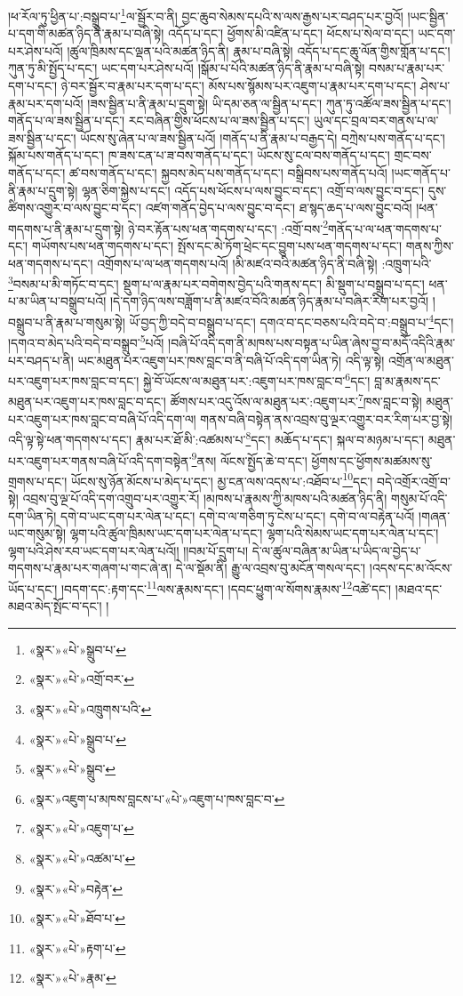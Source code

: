 །ཕ་རོལ་ཏུ་ཕྱིན་པ་:བསྒྲུབ་པ་\footnote{«སྣར་»«པེ་»སྒྲུབ་པ་}ལ་སྦྱོར་བ་ནི། བྱང་ཆུབ་སེམས་དཔའི་ས་ལས་རྒྱས་པར་བཤད་པར་བྱའོ། །ཡང་སྦྱིན་པ་དག་གི་མཚན་ཉིད་ནི་རྣམ་པ་བཞི་སྟེ། འདོད་པ་དང་། ཕྱོགས་མི་འཛིན་པ་དང་། ཕོངས་པ་སེལ་བ་དང་། ཡང་དག་པར་ཤེས་པའོ། །ཚུལ་ཁྲིམས་དང་ལྡན་པའི་མཚན་ཉིད་ནི། རྣམ་པ་བཞི་སྟེ། འདོད་པ་དང་ཆུ་ལོན་གྱིས་གློན་པ་དང་། ཀུན་ཏུ་མི་སྤྱོད་པ་དང་། ཡང་དག་པར་ཤེས་པའོ། །སྒོམ་པ་པོའི་མཚན་ཉིད་ནི་རྣམ་པ་བཞི་སྟེ། བསམ་པ་རྣམ་པར་དག་པ་དང་། ཉེ་བར་སྦྱོར་བ་རྣམ་པར་དག་པ་དང་། མོས་པས་སྙོམས་པར་འཇུག་པ་རྣམ་པར་དག་པ་དང་། ཤེས་པ་རྣམ་པར་དག་པའོ། །ཟས་སྦྱིན་པ་ནི་རྣམ་པ་དྲུག་སྟེ། ཡི་དམ་ཅན་ལ་སྦྱིན་པ་དང་། ཀུན་ཏུ་འཚོལ་ཟས་སྦྱིན་པ་དང་། གནོད་པ་ལ་ཟས་སྦྱིན་པ་དང་། རང་བཞིན་གྱིས་ཕོངས་པ་ལ་ཟས་སྦྱིན་པ་དང་། ཡུལ་དང་བྲལ་བར་གནས་པ་ལ་ཟས་སྦྱིན་པ་དང་། ཡོངས་སུ་ཞེན་པ་ལ་ཟས་སྦྱིན་པའོ། །གནོད་པ་ནི་རྣམ་པ་བརྒྱད་དེ། བཀྲེས་པས་གནོད་པ་དང་། སྐོམ་པས་གནོད་པ་དང་། ཁ་ཟས་ངན་པ་ཟ་བས་གནོད་པ་དང་། ཡོངས་སུ་ངལ་བས་གནོད་པ་དང་། གྲང་བས་གནོད་པ་དང་། ཚ་བས་གནོད་པ་དང་། སྐྱབས་མེད་པས་གནོད་པ་དང་། བསྒྲིབས་པས་གནོད་པའོ། །ཡང་གནོད་པ་ནི་རྣམ་པ་དྲུག་སྟེ། ལྷན་ཅིག་སྐྱེས་པ་དང་། འདོད་པས་ཕོངས་པ་ལས་བྱུང་བ་དང་། འགྲོ་བ་ལས་བྱུང་བ་དང་། དུས་ཚིགས་འགྱུར་བ་ལས་བྱུང་བ་དང་། འཛག་གནོད་བྱེད་པ་ལས་བྱུང་བ་དང་། ཐ་སྙད་ཆད་པ་ལས་བྱུང་བའོ། །ཕན་གདགས་པ་ནི་རྣམ་པ་དྲུག་སྟེ། ཉེ་བར་རྟོན་པས་ཕན་གདགས་པ་དང་། :འགྲོ་བས་\footnote{«སྣར་»«པེ་»འགྲོ་བར་}གནོད་པ་ལ་ཕན་གདགས་པ་དང་། གཡོགས་པས་ཕན་གདགས་པ་དང་། སྤོས་དང་མེ་ཏོག་ཕྲེང་དང་བྱུག་པས་ཕན་གདགས་པ་དང་། གནས་ཀྱིས་ཕན་གདགས་པ་དང་། འགྲོགས་པ་ལ་ཕན་གདགས་པའོ། །མི་མཛའ་བའི་མཚན་ཉིད་ནི་བཞི་སྟེ། :འཁྲུག་པའི་\footnote{«སྣར་»«པེ་»འཁྲུགས་པའི་}བསམ་པ་མི་གཏོང་བ་དང་། སྡུག་པ་ལ་རྣམ་པར་བགེགས་བྱེད་པའི་གནས་དང་། མི་སྡུག་པ་བསྒྲུབ་པ་དང་། ཕན་པ་མ་ཡིན་པ་བསྒྲུབ་པའོ། །དེ་དག་ཉིད་ལས་བཟློག་པ་ནི་མཛའ་བོའི་མཚན་ཉིད་རྣམ་པ་བཞིར་རིག་པར་བྱའོ། །བསྒྲུབ་པ་ནི་རྣམ་པ་གསུམ་སྟེ། ཡོ་བྱད་ཀྱི་བདེ་བ་བསྒྲུབ་པ་དང་། དགའ་བ་དང་བཅས་པའི་བདེ་བ་:བསྒྲུབ་པ་\footnote{«སྣར་»«པེ་»སྒྲུབ་པ་}དང་། །དགའ་བ་མེད་པའི་བདེ་བ་བསྒྲུབ་\footnote{«སྣར་»«པེ་»སྒྲུབ་}པའོ། །བཞི་པོ་འདི་དག་ནི་མཁས་པས་བསྟན་པ་ཡིན་ཞེས་བྱ་བ་མདོ་འདིའི་རྣམ་པར་བཤད་པ་ནི། ཡང་མཐུན་པར་འཇུག་པར་ཁས་བླང་བ་ནི་བཞི་པོ་འདི་དག་ཡིན་ཏེ། འདི་ལྟ་སྟེ། འགྲོན་ལ་མཐུན་པར་འཇུག་པར་ཁས་བླང་བ་དང་། སྐྱེ་བོ་ཡོངས་ལ་མཐུན་པར་:འཇུག་པར་ཁས་བླང་བ་\footnote{«སྣར་»འཇུག་པ་མཁས་བླངས་པ་«པེ་»འཇུག་པ་ཁས་བླང་བ་}དང་། བླ་མ་རྣམས་དང་མཐུན་པར་འཇུག་པར་ཁས་བླང་བ་དང་། ཚོགས་པར་འདུ་འོས་ལ་མཐུན་པར་:འཇུག་པར་\footnote{«སྣར་»«པེ་»འཇུག་པ་}ཁས་བླང་བ་སྟེ། མཐུན་པར་འཇུག་པར་ཁས་བླང་བ་བཞི་པོ་འདི་དག་ལ། གནས་བཞི་བསྟེན་ནས་འབྲས་བུ་ལྔར་འགྱུར་བར་རིག་པར་བྱ་སྟེ། འདི་ལྟ་སྟེ་ཕན་གདགས་པ་དང་། རྣམ་པར་ཐོ་མི་:འཚམས་པ་\footnote{«སྣར་»«པེ་»འཚམ་པ་}དང་། མཆོད་པ་དང་། སྐལ་བ་མཉམ་པ་དང་། མཐུན་པར་འཇུག་པར་གནས་བཞི་པོ་འདི་དག་བསྟེན་\footnote{«སྣར་»«པེ་»བརྟེན་}ནས། ལོངས་སྤྱོད་ཆེ་བ་དང་། ཕྱོགས་དང་ཕྱོགས་མཚམས་སུ་གྲགས་པ་དང་། ཡོངས་སུ་ཉོན་མོངས་པ་མེད་པ་དང་། མྱ་ངན་ལས་འདས་པ་:འཐོབ་པ་\footnote{«སྣར་»«པེ་»ཐོབ་པ་}དང་། བདེ་འགྲོར་འགྲོ་བ་སྟེ། འབྲས་བུ་ལྔ་པོ་འདི་དག་འགྲུབ་པར་འགྱུར་རོ། །མཁས་པ་རྣམས་ཀྱི་མཁས་པའི་མཚན་ཉིད་ནི། གསུམ་པོ་འདི་དག་ཡིན་ཏེ། དགེ་བ་ཡང་དག་པར་ལེན་པ་དང་། དགེ་བ་ལ་གཅིག་ཏུ་ངེས་པ་དང་། དགེ་བ་ལ་བརྟེན་པའོ། །གཞན་ཡང་གསུམ་སྟེ། ལྷག་པའི་ཚུལ་ཁྲིམས་ཡང་དག་པར་ལེན་པ་དང་། ལྷག་པའི་སེམས་ཡང་དག་པར་ལེན་པ་དང་། ལྷག་པའི་ཤེས་རབ་ཡང་དག་པར་ལེན་པའོ།། །།བམ་པོ་དྲུག་པ། དེ་ལ་ཚུལ་བཞིན་མ་ཡིན་པ་ཡིད་ལ་བྱེད་པ་གདགས་པ་རྣམ་པར་གཞག་པ་གང་ཞེ་ན། དེ་ལ་སྡོམ་ནི། རྒྱུ་ལ་འབྲས་བུ་མངོན་གསལ་དང་། །འདས་དང་མ་འོངས་ཡོད་པ་དང་། །བདག་དང་:རྟག་དང་\footnote{«སྣར་»«པེ་»རྟག་པ་}ལས་རྣམས་དང་། །དབང་ཕྱུག་ལ་སོགས་རྣམས་\footnote{«སྣར་»«པེ་»རྣམ་}འཚེ་དང་། །མཐའ་དང་མཐའ་མེད་སྤོང་བ་དང་། །
